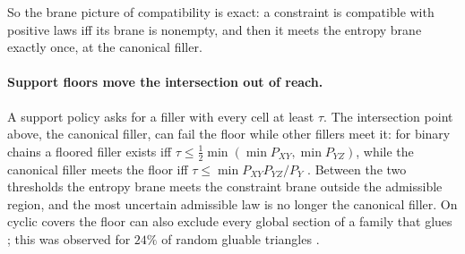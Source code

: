 \documentclass[11pt]{article}
\theoremstyle{definition}
\theoremstyle{remark}
\begin{document}
So the brane picture of compatibility is exact: a constraint is compatible with positive laws iff its brane is nonempty, and
then it meets the entropy brane exactly once, at the canonical filler.

\paragraph{Support floors move the intersection out of reach.} A support policy asks for a filler with every cell at least $\tau$. The intersection point above, the canonical filler, can fail
the floor while other fillers meet it: for binary chains a floored filler exists iff $\tau\le\tfrac12\min(\min P_{XY},\min P_{YZ})$, while
the canonical filler meets the floor iff $\tau\le\min P_{XY}P_{YZ}/P_Y$ \cite[Prop.~4.7]{Conditionals}. Between the two thresholds the
entropy brane meets the constraint brane outside the admissible region, and the most uncertain admissible law is no longer the
canonical filler. On cyclic covers the floor can also exclude every global section of a family that glues
\cite[Thm.~4.8]{Conditionals}; this was observed for $24\%$ of random gluable triangles \cite[Section~14]{Validation}.
\end{document}
